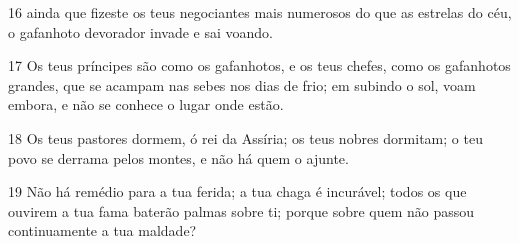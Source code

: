 \par 16 ainda que fizeste os teus negociantes mais numerosos do que as estrelas do céu, o gafanhoto devorador invade e sai voando.
\par 17 Os teus príncipes são como os gafanhotos, e os teus chefes, como os gafanhotos grandes, que se acampam nas sebes nos dias de frio; em subindo o sol, voam embora, e não se conhece o lugar onde estão.
\par 18 Os teus pastores dormem, ó rei da Assíria; os teus nobres dormitam; o teu povo se derrama pelos montes, e não há quem o ajunte.
\par 19 Não há remédio para a tua ferida; a tua chaga é incurável; todos os que ouvirem a tua fama baterão palmas sobre ti; porque sobre quem não passou continuamente a tua maldade?


